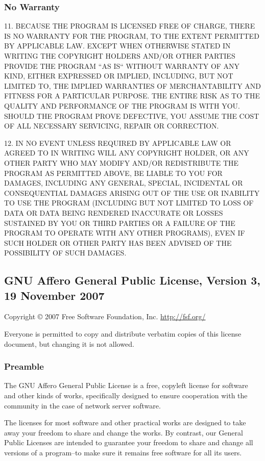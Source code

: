 \documentclass[a4paper, 11pt, twoside]{article}
\begin{document}
\subsubsection{No Warranty}

11. BECAUSE THE PROGRAM IS LICENSED FREE OF CHARGE, THERE IS NO WARRANTY FOR THE PROGRAM, TO THE EXTENT PERMITTED BY APPLICABLE LAW. EXCEPT WHEN OTHERWISE STATED IN WRITING THE COPYRIGHT HOLDERS AND/OR OTHER PARTIES PROVIDE THE PROGRAM “AS IS“ WITHOUT WARRANTY OF ANY KIND, EITHER EXPRESSED OR IMPLIED, INCLUDING, BUT NOT LIMITED TO, THE IMPLIED WARRANTIES OF MERCHANTABILITY AND FITNESS FOR A PARTICULAR PURPOSE. THE ENTIRE RISK AS TO THE QUALITY AND PERFORMANCE OF THE PROGRAM IS WITH YOU. SHOULD THE PROGRAM PROVE DEFECTIVE, YOU ASSUME THE COST OF ALL NECESSARY SERVICING, REPAIR OR CORRECTION.

12. IN NO EVENT UNLESS REQUIRED BY APPLICABLE LAW OR AGREED TO IN WRITING WILL ANY COPYRIGHT HOLDER, OR ANY OTHER PARTY WHO MAY MODIFY AND/OR REDISTRIBUTE THE PROGRAM AS PERMITTED ABOVE, BE LIABLE TO YOU FOR DAMAGES, INCLUDING ANY GENERAL, SPECIAL, INCIDENTAL OR CONSEQUENTIAL DAMAGES ARISING OUT OF THE USE OR INABILITY TO USE THE PROGRAM (INCLUDING BUT NOT LIMITED TO LOSS OF DATA OR DATA BEING RENDERED INACCURATE OR LOSSES SUSTAINED BY YOU OR THIRD PARTIES OR A FAILURE OF THE PROGRAM TO OPERATE WITH ANY OTHER PROGRAMS), EVEN IF SUCH HOLDER OR OTHER PARTY HAS BEEN ADVISED OF THE POSSIBILITY OF SUCH DAMAGES.

\subsection{GNU Affero General Public License, Version 3, 19 November 2007}

Copyright © 2007 Free Software Foundation, Inc. \href{http://fsf.org/}{http://fsf.org/}

Everyone is permitted to copy and distribute verbatim copies of this license document, but changing it is not allowed.

\subsubsection{Preamble}

The GNU Affero General Public License is a free, copyleft license for software and other kinds of works, specifically designed to ensure cooperation with the community in the case of network server software.

The licenses for most software and other practical works are designed to take away your freedom to share and change the works. By contrast, our General Public Licenses are intended to guarantee your freedom to share and change all versions of a program--to make sure it remains free software for all its users.
\end{document}
